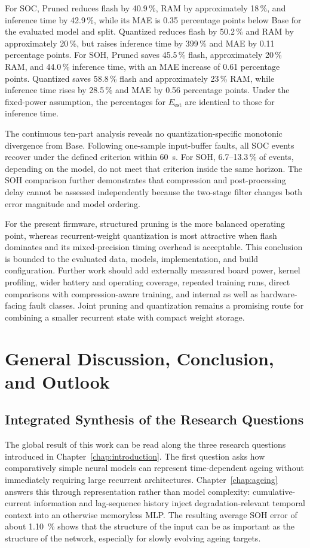 \documentclass[
    a4paper,
    12pt,
    titlepage,
    bibliography=totoc,
    twoside=on,
    parskip=false,
    numbers=noenddot,
    cleardoublepage=empty,
    DIV=12,
    BCOR=12.0mm,
    headheight=36pt,
    headings=openright
]{scrreprt}
\begin{document}
For SOC, Pruned reduces flash by 40.9\,\%, RAM by approximately 18\,\%, and inference time by 42.9\,\%, while its MAE is 0.35 percentage points below Base for the evaluated model and split. Quantized reduces flash by 50.2\,\% and RAM by approximately 20\,\%, but raises inference time by 399\,\% and MAE by 0.11 percentage points. For SOH, Pruned saves 45.5\,\% flash, approximately 20\,\% RAM, and 44.0\,\% inference time, with an MAE increase of 0.61 percentage points. Quantized saves 58.8\,\% flash and approximately 23\,\% RAM, while inference time rises by 28.5\,\% and MAE by 0.56 percentage points. Under the fixed-power assumption, the percentages for $E_{\mathrm{est}}$ are identical to those for inference time.

The continuous ten-part analysis reveals no quantization-specific monotonic divergence from Base. Following one-sample input-buffer faults, all SOC events recover under the defined criterion within 60~s. For SOH, 6.7--13.3\,\% of events, depending on the model, do not meet that criterion inside the same horizon. The SOH comparison further demonstrates that compression and post-processing delay cannot be assessed independently because the two-stage filter changes both error magnitude and model ordering.

For the present firmware, structured pruning is the more balanced operating point, whereas recurrent-weight quantization is most attractive when flash dominates and its mixed-precision timing overhead is acceptable. This conclusion is bounded to the evaluated data, models, implementation, and build configuration. Further work should add externally measured board power, kernel profiling, wider battery and operating coverage, repeated training runs, direct comparisons with compression-aware training, and internal as well as hardware-facing fault classes. Joint pruning and quantization remains a promising route for combining a smaller recurrent state with compact weight storage.
\chapter{General Discussion, Conclusion, and Outlook}
\label{chap:synthesis}
\section{Integrated Synthesis of the Research Questions}
The global result of this work can be read along the three research questions introduced in Chapter~\ref{chap:introduction}. The first question asks how comparatively simple neural models can represent time-dependent ageing without immediately requiring large recurrent architectures. Chapter~\ref{chap:ageing} answers this through representation rather than model complexity: cumulative-current information and lag-sequence history inject degradation-relevant temporal context into an otherwise memoryless MLP. The resulting average SOH error of about \SI{1.10}{\percent} shows that the structure of the input can be as important as the structure of the network, especially for slowly evolving ageing targets.
\end{document}
